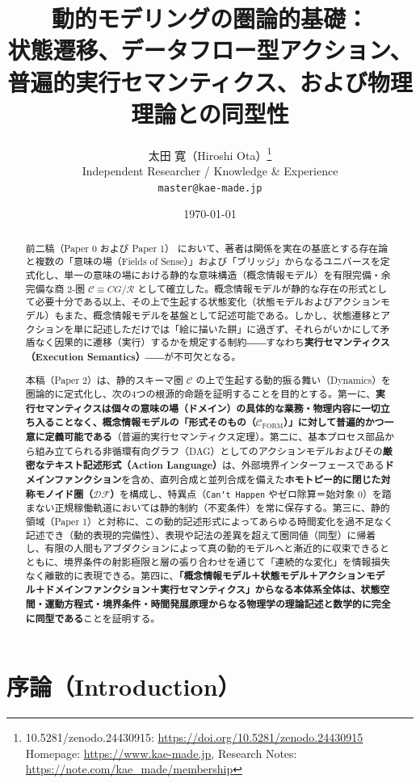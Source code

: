 \documentclass[11pt,a4paper]{ltjsarticle}
\title{\textbf{動的モデリングの圏論的基礎：\\
状態遷移、データフロー型アクション、普遍的実行セマンティクス、および物理理論との同型性}}
\author{太田 寛（Hiroshi Ota）\thanks{10.5281/zenodo.24430915: \url{https://doi.org/10.5281/zenodo.24430915} \\ Homepage: \url{https://www.kae-made.jp}, Research Notes: \url{https://note.com/kae_made/membership}} \\
\small Independent Researcher / Knowledge \& Experience \\
\small \texttt{master@kae-made.jp}}
\date{\today}
\theoremstyle{definition}
\theoremstyle{plain}
\theoremstyle{remark}
\newcommand{\DF}{\mathcal{DF}}
\newcommand{\Cform}{\mathcal{C}_{\mathrm{FORM}}}
\begin{document}
\maketitle

\begin{abstract}
前二稿（Paper 0 および Paper 1）\cite{ota2026paper0,ota2026paper1} において、著者は関係を実在の基底とする存在論と複数の「意味の場（Fields of Sense）」および「ブリッジ」からなるユニバースを定式化し、単一の意味の場における静的な意味構造（概念情報モデル）を有限完備・余完備な商 2-圏 $\mathcal{C} \equiv CG/\mathcal{R}$ として確立した。概念情報モデルが静的な存在の形式として必要十分である以上、その上で生起する状態変化（状態モデルおよびアクションモデル）もまた、概念情報モデルを基盤として記述可能である。しかし、状態遷移とアクションを単に記述しただけでは「絵に描いた餅」に過ぎず、それらがいかにして矛盾なく因果的に遷移（実行）するかを規定する制約――すなわち\textbf{実行セマンティクス（Execution Semantics）}――が不可欠となる。

本稿（Paper 2）は、静的スキーマ圏 $\mathcal{C}$ の上で生起する動的振る舞い（Dynamics）を圏論的に定式化し、次の4つの根源的命題を証明することを目的とする。第一に、\textbf{実行セマンティクスは個々の意味の場（ドメイン）の具体的な業務・物理内容に一切立ち入ることなく、概念情報モデルの「形式そのもの（$\Cform$）」に対して普遍的かつ一意に定義可能である}（普遍的実行セマンティクス定理）。第二に、基本プロセス部品から組み立てられる非循環有向グラフ（DAG）としてのアクションモデルおよびその\textbf{厳密なテキスト記述形式（Action Language）}は、外部境界インターフェースである\textbf{ドメインファンクション}を含め、直列合成と並列合成を備えた\textbf{ホモトピー的に閉じた対称モノイド圏（$\DF$）}を構成し、特異点（\texttt{Can't Happen} やゼロ除算＝始対象 $0$）を踏まない正規稼働軌道においては静的制約（不変条件）を常に保存する。第三に、静的領域（Paper 1）と対称に、この動的記述形式によってあらゆる時間変化を過不足なく記述でき（動的表現的完備性）、表現や記法の差異を超えて圏同値（同型）に帰着し、有限の人間もアブダクションによって真の動的モデルへと漸近的に収束できるとともに、境界条件の射影極限と層の張り合わせを通じて「連続的な変化」を情報損失なく離散的に表現できる。第四に、\textbf{「概念情報モデル＋状態モデル＋アクションモデル＋ドメインファンクション＋実行セマンティクス」からなる本体系全体は、状態空間・運動方程式・境界条件・時間発展原理からなる物理学の理論記述と数学的に完全に同型である}ことを証明する。
\end{abstract}

\section{序論（Introduction）}
\end{document}
